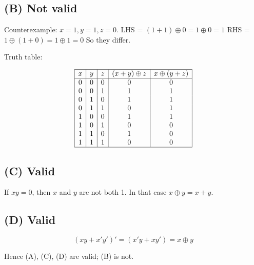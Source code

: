 \documentclass[12pt,a4paper]{article}
\begin{document}
\subsection*{(B) Not valid}
Counterexample: $x=1,y=1,z=0$.  
LHS = $(1+1)\oplus 0 = 1 \oplus 0 = 1$  
RHS = $1 \oplus (1+0) = 1 \oplus 1 = 0$  
So they differ.

Truth table:

\[
\begin{array}{|c|c|c|c|c|}
\hline
x & y & z & (x+y)\oplus z & x \oplus (y+z) \\
\hline
0 & 0 & 0 & 0 & 0 \\
0 & 0 & 1 & 1 & 1 \\
0 & 1 & 0 & 1 & 1 \\
0 & 1 & 1 & 0 & 1 \\
1 & 0 & 0 & 1 & 1 \\
1 & 0 & 1 & 0 & 0 \\
1 & 1 & 0 & 1 & 0 \\
1 & 1 & 1 & 0 & 0 \\
\hline
\end{array}
\]

\subsection*{(C) Valid}
If $xy=0$, then $x$ and $y$ are not both 1. In that case $x\oplus y = x+y$.  

\subsection*{(D) Valid}
\[
(xy + x'y')' = (x'y + xy') = x \oplus y
\]

Hence (A), (C), (D) are valid; (B) is not.
\end{document}
